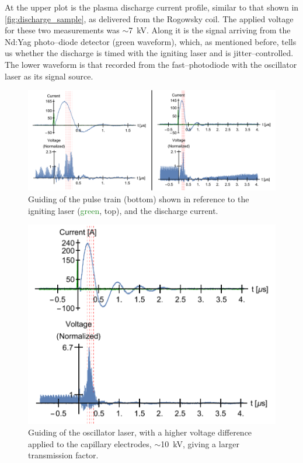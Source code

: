 \documentclass[../main.tex]{subfiles}
\begin{document}
At the upper plot is the plasma discharge current profile, similar to that shown in \ref{fig:discharge_sample}, as delivered from the Rogowsky coil. The applied voltage for these two measurements was $\sim$\SI{7}{\kilo\volt}. Along it is the signal arriving from the Nd:Yag photo--diode detector (green waveform), which, as mentioned before, tells us whether the discharge is timed with the igniting laser and is jitter--controlled. The lower waveform is that recorded from the fast--photodiode with the oscillator laser as its signal source.
\begin{figure}
    \centering
    \includegraphics[width=\textwidth]{figures/oscillator/guiding1.pdf}
    \caption{Guiding of the pulse train (bottom) shown in reference to the igniting laser (\textcolor{ForestGreen}{green}, top), and the discharge current.}
    \label{fig:guiding1}
\end{figure}
\begin{figure}
    \centering
    \includegraphics[width=\textwidth]{figures/oscillator/guiding2.pdf}
    \caption{Guiding of the oscillator laser, with a higher voltage difference applied to the capillary electrodes, $\sim$\SI{10}{\kilo\volt}, giving a larger transmission factor.}
    \label{fig:guiding2}
\end{figure}
\end{document}
